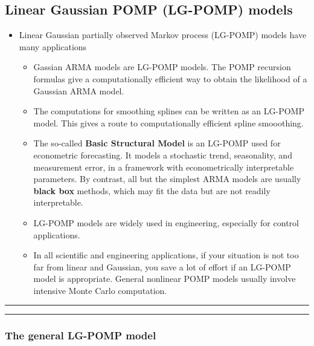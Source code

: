 \documentclass[]{article}
\begin{document}
\subsection{Linear Gaussian POMP (LG-POMP)
models}\label{linear-gaussian-pomp-lg-pomp-models}

\begin{itemize}
\item
  Linear Gaussian partially observed Markov process (LG-POMP) models
  have many applications

  \begin{itemize}
  \item
    Gassian ARMA models are LG-POMP models. The POMP recursion formulas
    give a computationally efficient way to obtain the likelihood of a
    Gaussian ARMA model.
  \item
    The computations for smoothing splines can be written as an LG-POMP
    model. This gives a route to computationally efficient spline
    smooothing.
  \item
    The so-called \textbf{Basic Structural Model} is an LG-POMP used for
    econometric forecasting. It models a stochastic trend, seasonality,
    and measurement error, in a framework with econometrically
    interpretable parameters. By contrast, all but the simplest ARMA
    models are usually \textbf{black box} methods, which may fit the
    data but are not readily interpretable.
  \item
    LG-POMP models are widely used in engineering, especially for
    control applications.
  \item
    In all scientific and engineering applications, if your situation is
    not too far from linear and Gaussian, you save a lot of effort if an
    LG-POMP model is appropriate. General nonlinear POMP models usually
    involve intensive Monte Carlo computation.
  \end{itemize}
\end{itemize}

\begin{center}\rule{0.5\linewidth}{\linethickness}\end{center}

\begin{center}\rule{0.5\linewidth}{\linethickness}\end{center}

\subsubsection{The general LG-POMP
model}\label{the-general-lg-pomp-model}
\end{document}

